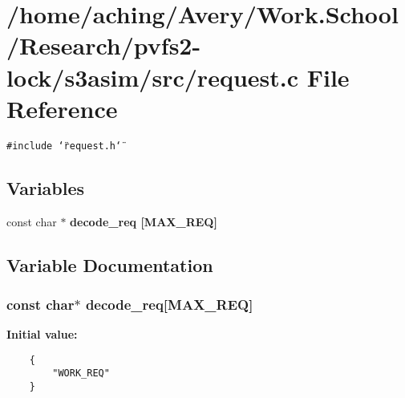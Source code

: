 \section{/home/aching/Avery/Work.School/Research/pvfs2-lock/s3asim/src/request.c File Reference}
\label{request_8c}
{\tt \#include \char`\"{}request.h\char`\"{}}\par
\subsection*{Variables}
\begin{CompactItemize}
\item 
const char $\ast$ \bf{decode\_\-req} [MAX\_\-REQ]
\end{CompactItemize}


\subsection{Variable Documentation}
\subsubsection{\setlength{\rightskip}{0pt plus 5cm}const char$\ast$ \bf{decode\_\-req}[MAX\_\-REQ]}\label{request_8c_c7d698c4846c35ca7e094db48d21a2ed}


\textbf{Initial value:}

\begin{Code}\begin{verbatim} 
    {
        "WORK_REQ"
    }
\end{verbatim}\end{Code}
